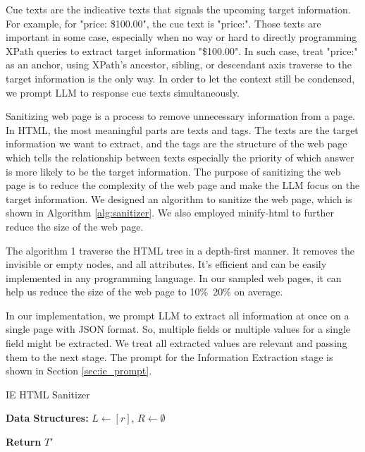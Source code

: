 \documentclass[a4paper]{article}
\begin{document}
Cue texts are the indicative texts that signals the upcoming target information. For example, for "price: \$100.00", the cue text is "price:". Those texts are important in some case, especially when no way or hard to directly programming XPath queries to extract target information "\$100.00". In such case, treat "price:" as an anchor, using XPath's ancestor, sibling, or descendant axis traverse to the target information is the only way. In order to let the context still be condensed, we prompt LLM to response cue texts simultaneously.

Sanitizing web page is a process to remove unnecessary information from a page. In HTML, the most meaningful parts are texts and tags. The texts are the target information we want to extract, and the tags are the structure of the web page which tells the relationship between texts especially the priority of which answer is more likely to be the target information. The purpose of sanitizing the web page is to reduce the complexity of the web page and make the LLM focus on the target information. We designed an algorithm to sanitize the web page, which is shown in Algorithm \ref{alg:sanitizer}. We also employed minify-html\cite{minifyhtml} to further reduce the size of the web page.

The algorithm 1 traverse the HTML tree in a depth-first manner. It removes the invisible or empty nodes, and all attributes. It's efficient and can be easily implemented in any programming language. In our sampled web pages, it can help us reduce the size of the web page to 10\%~20\% on average.

In our implementation, we prompt LLM to extract all information at once on a single page with JSON format. So, multiple fields or multiple values for a single field might be extracted. We treat all extracted values are relevant and passing them to the next stage. The prompt for the Information Extraction stage is shown in Section \ref{sec:ie_prompt}.

\begin{algorithm*}[h]
  \SetAlgoLined
  \caption{IE HTML Sanitizer}
  \label{alg:sanitizer}
  
  \textbf{Data Structures:}
  $L \gets [r]$,
  $R \gets \emptyset$
  
  

  \textbf{Return} $T'$
\end{algorithm*}
\end{document}
